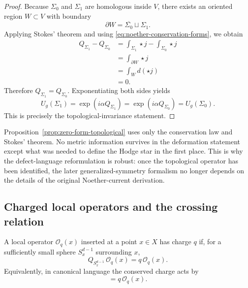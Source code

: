 \begin{proof}
Because $\Sigma_0$ and $\Sigma_1$ are homologous inside $V$, there exists an oriented region $W \subset V$ with boundary
\begin{equation*}
\partial W = \overline{\Sigma_0}\sqcup \Sigma_1.
\end{equation*}
Applying Stokes' theorem and using \eqref{eq:noether-conservation-forms}, we obtain
\begin{align*}
Q_{\Sigma_1}-Q_{\Sigma_0}
&=
\int_{\Sigma_1}\star j-\int_{\Sigma_0}\star j \\
&=
\int_{\partial W}\star j \\
&=
\int_W d(\star j) \\
&= 0.
\end{align*}
Therefore $Q_{\Sigma_1}=Q_{\Sigma_0}$. Exponentiating both sides yields
\begin{equation*}
U_g(\Sigma_1)=\exp(i\alpha Q_{\Sigma_1})
=
\exp(i\alpha Q_{\Sigma_0})
=
U_g(\Sigma_0).
\end{equation*}
This is precisely the topological-invariance statement.
\end{proof}

\begin{remark}\label{rem:zero-form-ingredients}
Proposition~\ref{prop:zero-form-topological} uses only the conservation law and Stokes' theorem. No metric information survives in the deformation statement except what was needed to define the Hodge star in the first place. This is why the defect-language reformulation is robust: once the topological operator has been identified, the later generalized-symmetry formalism no longer depends on the details of the original Noether-current derivation.
\end{remark}

\subsection{Charged local operators and the crossing relation}

\begin{definition}\label{def:charged-local-operator}
A local operator $\mathcal O_q(x)$ inserted at a point $x\in X$ has charge $q$ if, for a sufficiently small sphere $S_x^{d-1}$ surrounding $x$,
\begin{equation}\label{eq:local-charge}
Q_{S_x^{d-1}}\,\mathcal O_q(x)=q\,\mathcal O_q(x).
\end{equation}
Equivalently, in canonical language the conserved charge acts by
\begin{equation*}
[Q,\mathcal O_q(x)] = q\,\mathcal O_q(x).
\end{equation*}
\end{definition}

